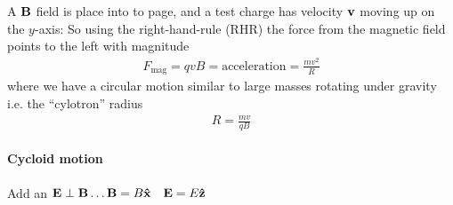 \documentclass[../main.tex]{subfiles}
\begin{document}
A $\vb B$ field is place into to page, and a test charge has velocity $\vb v$ moving up on the $y$-axis:
So using the right-hand-rule (RHR) the force from the magnetic field points to the left with magnitude
\begin{align*}
    F_\text{mag} = qvB = \text{acceleration} = \frac{mv^2}{R}
\end{align*}
where we have a circular motion similar to large masses rotating under gravity i.e. the ``cylotron'' radius 
\begin{align*}
    R = \frac{mv}{qB}
\end{align*}

\paragraph{Cycloid motion}

Add an $\vb E \perp \vb B \dots \vb B = B \vu x \quad \vb E = E \vu z$ 
\end{document}
